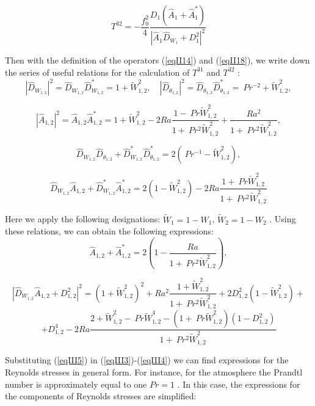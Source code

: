 \documentclass [12pt]{article}
\begin{document}
\begin{equation}\label{eqIII4}
    T^{32} =-\frac{f_{0}^{2} }{4} \frac{D_{1}(\widehat A_{1}+\widehat A_{1}^{*})  }{\left|\widehat A_{1}\widehat{D}_{W_{1} } +D_{1}^{2} \right|^{2}}
\end{equation}

Then with the definition of the operators (\ref{eqII14}) and (\ref{eqII18}), we write down the series of useful relations for the calculation of  $T^{31} $  and    $T^{32} $ :
\[ \left| {\widehat{D}_{{W}_{1,2}}} \right|^{2}  = \widehat{D}_{{W}_{1,2}} \hat {D}_{{W}_{1,2} }^{*}  = 1 + \widetilde {W}_{1,2}^2,\quad \left| {\widehat{D}_{\theta_{1,2}}} \right|^{2}  = \widehat {D}_{\theta_{1,2} } \widehat {D}_{\theta _{1,2} }^{*}  = \ Pr^{-2}  + \widetilde{W}_{1,2}^{2}, \]

\[\left| {\widehat A_{1,2} } \right|^2  = \hat A_{1,2} \widehat A_{1,2}^*  = 1 + \widetilde W_{1,2}^2  - 2Ra\frac{{1 - \ Pr \widetilde W_{1,2}^2 }}{{1 + \ Pr ^2 \widetilde W_{1,2}^2 }} + \frac{{Ra^2 }}{{1 + \ Pr ^2 \widetilde W_{1,2}^2 }}, \]

\[\widehat D_{W_{1,2} } \widehat D_{\theta _{1,2} }  + \widehat D_{W_{1,2}}^* \widehat D_{\theta _{1,2}}^*  = 2(\ Pr ^{-1}  - \tilde W_{1,2}^2 ),\]


\[\widehat D_{W_{1,2} } \widehat A_{1,2}  + \widehat D_{W_{1,2} }^* \widehat A_{1,2}^*  = 2(1 -\widetilde W_{1,2}^2 ) - 2Ra\frac{{1 + \ Pr \widetilde W_{1,2}^2 }}{{1 + \ Pr^2 \widetilde W_{1,2}^2 }}\]

Here we apply the following designations: $\widetilde{W}_{1} =1-W_{1} $, $\widetilde{W}_{2} =1-W_{2} $ . Using these relations,  we can obtain the following expressions:
\[\widehat A_{1,2}  + \widehat A_{1,2}^*  = 2\left( {1 - \frac{{Ra}}{{1 + \ Pr^2 \widetilde W_{1,2}^2 }}} \right),\]

\begin{equation}\label{eqIII5}\end{equation}
\[\left| {\widehat D_{W_{1,2} } \widehat A_{1,2}  + D_{1,2}^2 } \right|^2  = \left( {1 + \widetilde W_{1,2}^2 } \right)^2  + Ra^2 \frac{{1 + \widetilde W_{1,2}^2 }}{{1 + \ Pr ^2 \widetilde W_{1,2}^2 }} + 2D_{1,2}^2 (1 - \widetilde W_{1,2}^2 ) + \]
 \[ + D_{1,2}^4  - 2Ra\frac{{2 + \widetilde W_{1,2}^2  - \ Pr \widetilde W_{1,2}^4  - (1 + \ Pr \widetilde W_{1,2}^2 )(1 - D_{1,2}^2 )}}{{1 + \ Pr^2 \widetilde W_{1,2}^2 }} \]

Substituting (\ref{eqIII5}) in (\ref{eqIII3})-(\ref{eqIII4}) we can find expressions for the Reynolds stresses in general form. For instance, for the atmosphere the Prandtl number is approximately equal to one  $Pr=1$ . In this case, the expressions for the components of Reynolds stresses are simplified:
\end{document}
